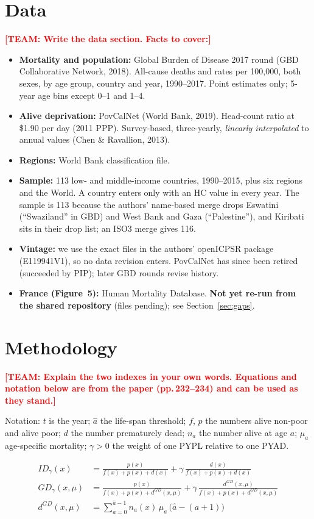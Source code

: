 \documentclass[12pt,a4paper]{article}
\newcommand{\todo}[1]{\textbf{\textcolor{red}{[TEAM: #1]}}}
\newcommand{\ahat}{\hat{a}}
\begin{document}
\section{Data}
\todo{Write the data section. Facts to cover:}
\begin{itemize}
  \item \textbf{Mortality and population:} Global Burden of Disease 2017 round (GBD Collaborative Network, 2018). All-cause deaths and rates per 100,000, both sexes, by age group, country and year, 1990--2017. Point estimates only; 5-year age bins except 0--1 and 1--4.
  \item \textbf{Alive deprivation:} PovCalNet (World Bank, 2019). Head-count ratio at \$1.90 per day (2011 PPP). Survey-based, three-yearly, \emph{linearly interpolated} to annual values (Chen \& Ravallion, 2013).
  \item \textbf{Regions:} World Bank classification file.
  \item \textbf{Sample:} 113 low- and middle-income countries, 1990--2015, plus six regions and the World. A country enters only with an HC value in every year. The sample is 113 because the authors' name-based merge drops Eswatini (``Swaziland'' in GBD) and West Bank and Gaza (``Palestine''), and Kiribati sits in their drop list; an ISO3 merge gives 116.
  \item \textbf{Vintage:} we use the exact files in the authors' openICPSR package (E119941V1), so no data revision enters. PovCalNet has since been retired (succeeded by PIP); later GBD rounds revise history.
  \item \textbf{France (Figure~5):} Human Mortality Database. \textbf{Not yet re-run from the shared repository} (files pending); see Section~\ref{sec:gaps}.
\end{itemize}

\section{Methodology}
\todo{Explain the two indexes in your own words. Equations and notation below are from the paper (pp.\,232--234) and can be used as they stand.}

Notation: $t$ is the year; $\ahat$ the life-span threshold; $f$, $p$ the numbers alive non-poor and alive poor; $d$ the number prematurely dead; $n_a$ the number alive at age $a$; $\mu_a$ age-specific mortality; $\gamma>0$ the weight of one PYPL relative to one PYAD.

\begin{align}
ID_\gamma(x) &= \frac{p(x)}{f(x)+p(x)+d(x)} + \gamma\,\frac{d(x)}{f(x)+p(x)+d(x)} \label{eq:id}\\[0.3em]
GD_\gamma(x,\mu) &= \frac{p(x)}{f(x)+p(x)+d^{GD}(x,\mu)} + \gamma\,\frac{d^{GD}(x,\mu)}{f(x)+p(x)+d^{GD}(x,\mu)} \label{eq:gd}\\[0.3em]
d^{GD}(x,\mu) &= \sum_{a=0}^{\ahat-1} n_a(x)\,\mu_a\,\bigl(\ahat-(a+1)\bigr) \label{eq:dgd}
\end{align}
\end{document}
